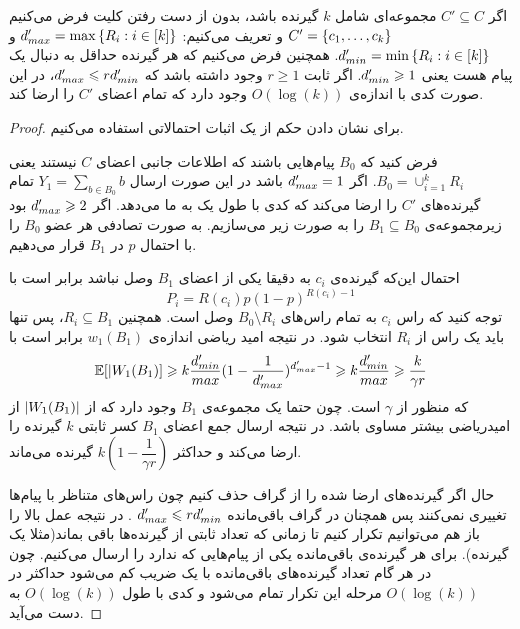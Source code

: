 \begin{lemma}
    \label{lemma:pliable2015:3}
    اگر
    $C' \subseteq C$
    مجموعه‌ای شامل
    $k$
    گیرنده‌ باشد، بدون از دست رفتن کلیت فرض می‌کنیم
    $C' = \left\{ c_1, \ldots, c_k \right\}$
    و تعریف می‌کنیم:
    $d_{max}' = \max\left\{ R_i: i \in [k]  \right\}$
    و
    $d_{min}' = \min\left\{ R_i: i \in [k]  \right\}$. همچنین فرض می‌کنیم که هر گیرنده حداقل به دنبال یک پیام هست یعنی
    $d_{min}' \geqslant 1$. اگر ثابت
    $r \geq 1$
    وجود داشته باشد که
    $d_{max}' \leqslant r d_{min}'$، در این صورت کدی با اندازه‌ی
    $O(\log(k))$
    وجود دارد که تمام اعضای
    $C'$
    را ارضا کند.
\end{lemma}
\begin{proof}
    برای نشان دادن حکم از یک اثبات احتمالاتی استفاده می‌کنیم.

    فرض کنید که
    $B_0$
    پیام‌هایی باشند که اطلاعات جانبی اعضای
    $C$
    نیستند یعنی
    $B_0 = \cup_{i = 1}^{k} R_i$. اگر
    $d_{max}' = 1$
    باشد در این صورت ارسال
    $Y_1 = \sum_{b \in B_0} b$
    تمام گیرنده‌های
    $C'$
    را ارضا می‌کند که کدی با طول یک به ما می‌دهد. اگر
    $d_{max}' \geqslant 2$
    بود زیرمجموعه‌ی
    $B_1 \subseteq B_0$
    را به صورت زیر می‌سازیم. به صورت تصادفی هر عضو
    $B_0$
    را با احتمال
    $p$
    در
    $B_1$
    قرار می‌دهیم.

    احتمال این‌که گیرنده‌ی
    $c_i$
    به دقیقا یکی از اعضای
    $B_1$
    وصل نباشد برابر است با
    $$P_i = R(c_i) p (1 - p)^{R(c_i) - 1}$$
    توجه کنید که راس
    $c_i$
    به تمام راس‌های
    $B_0 \setminus R_i$
    وصل است. همچنین
    $R_i \subseteq B_1$، پس تنها باید یک راس از
    $R_i$
    انتخاب شود. در نتیجه امید ریاضی اندازه‌ی
    $w_1(B_1)$
    برابر است با
    \begin{equation}
        \mathbb{E}[|W_1(B_1)] \geqslant k \dfrac{d_{min}'}{max}(1 - \dfrac{1}{d_{max}'})^{d_{max}' - 1} \geqslant k \dfrac{d_{min}'}{max} \geqslant \dfrac{k}{\gamma r}
    \end{equation}
    که منظور از
    $\gamma$
    است. چون حتما یک مجموعه‌ی
    $B_1$
    وجود دارد که از
    $\left|{W_1(B_1)}\right|$
    از امیدریاضی بیشتر مساوی باشد. در نتیجه ارسال جمع اعضای
    $B_1$
    کسر ثابتی
    $k$
    گیرنده‌ را ارضا می‌کند و حداکثر
    $k(1 - \dfrac{1}{\gamma r})$
    گیرنده می‌ماند.

    حال اگر گیرنده‌های ارضا شده را از گراف حذف کنیم چون راس‌های متناظر با پیام‌ها تغییری نمی‌کنند پس همچنان در گراف باقی‌مانده
    $d_{max}' \leqslant r d_{min}'$
    . در نتیجه عمل بالا را باز هم می‌توانیم تکرار کنیم تا زمانی که تعداد ثابتی از گیرنده‌ها باقی بماند(مثلا یک گیرنده). برای هر گیرنده‌ی باقی‌مانده یکی از پیام‌هایی که ندارد را ارسال می‌کنیم. چون در هر گام تعداد گیرنده‌های باقی‌مانده با یک ضریب کم می‌شود حداکثر در
    $O(\log(k))$
    مرحله این تکرار تمام می‌شود و کدی با طول
    $O(\log(k))$
    به دست می‌آید.
\end{proof}

